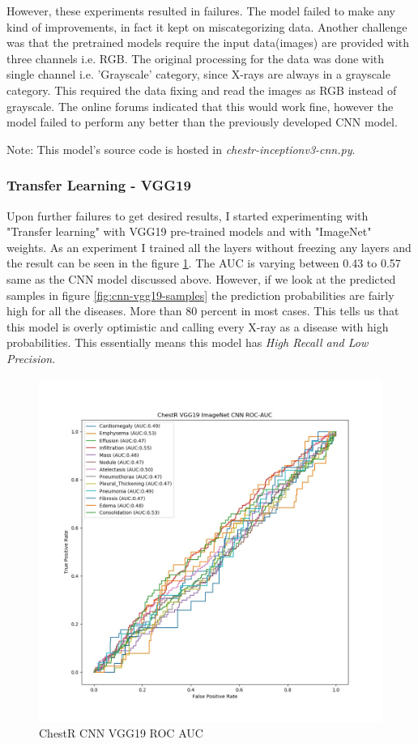 \documentclass{article}
\begin{document}
    However, these experiments resulted in failures. The model failed to make any kind of improvements, in fact it kept on miscategorizing data. Another challenge was that the pretrained models require the input data(images) are provided with three channels i.e. RGB. The original processing for the data was done with single channel i.e. 'Grayscale' category, since X-rays are always in a grayscale category. This required the data fixing and read the images as RGB instead of grayscale. The online forums indicated that this would work fine, however the model failed to perform any better than the previously developed CNN model.

    Note: This model's source code is hosted in \textit{chestr-inceptionv3-cnn.py}.

    \subsubsection{Transfer Learning - VGG19}  
    Upon further failures to get desired results, I started experimenting with "Transfer learning" with VGG19 pre-trained models and with "ImageNet" weights. As an experiment I trained all the layers without freezing any layers and the result can be seen in the figure \ref{fig:cnn-vgg19-roc-auc}. The AUC is varying between 0.43 to 0.57 same as the CNN model discussed above. However, if we look at the predicted samples in figure \ref{fig:cnn-vgg19-samples} the prediction probabilities are fairly high for all the diseases. More than 80 percent in most cases. This tells us that this model is overly optimistic and calling every X-ray as a disease with high probabilities. This essentially means this model has \textit{High Recall and Low Precision}. 

    \begin{figure}
        \includegraphics[width=\linewidth]{./images/chestr-vgg19_roc_auc.jpg}
        \caption{ChestR CNN VGG19 ROC AUC}
        \label{fig:cnn-vgg19-roc-auc}
    \end{figure}
\end{document}
